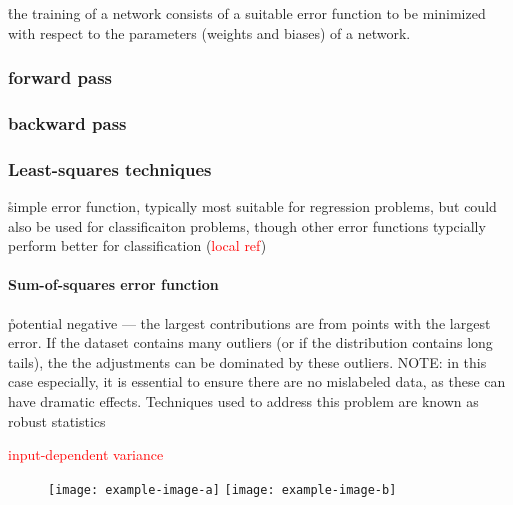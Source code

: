 
\r{the training of a network consists of a suitable error function to be minimized with respect to the parameters (weights and biases) of a network.}



\subsubsection{forward pass}

\subsubsection{backward pass}

\subsubsection{Least-squares techniques}

\r{simple error function, typically most suitable for regression problems, but could also be used for classificaiton problems, though other error functions typcially perform better for classification (\textcolor{red}{local ref})}

\paragraph{Sum-of-squares error function}

\r{potential negative --- the largest contributions are from points with the largest error. If the dataset contains many outliers (or if the distribution contains long tails), the the adjustments can be dominated by these outliers. NOTE: in this case especially, it is essential to ensure there are no mislabeled data, as these can have dramatic effects. Techniques used to address this problem are known as robust statistics }

\textcolor{red}{input-dependent variance}

\begin{figure}[htp]
	\centering
	\texttt{[image: example-image-a]}\hfil
	\texttt{[image: example-image-b]}\hfil
	\caption{ }
	\label{fig:basics_error_fn_sumofsquares_outlier}
\end{figure}

